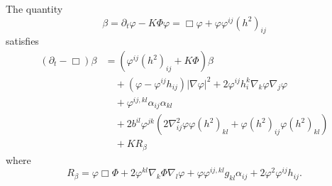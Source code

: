 \documentclass{amsart}
\begin{document}
\begin{lemma}
\label{lem:evbeta}
The quantity 
\[
\beta = \partial_t \varphi - K\Phi\varphi = \Box\varphi +  \varphi\varphi^{ij} (h^2)_{ij}
\]
satisfies
\[
\begin{split}
(\partial_{t} - \Box)\beta &= \left(\varphi^{ij}(h^2)_{ij} + K\Phi \right)\beta \\
&\quad + (\varphi - \varphi^{ij}h_{ij}) |\nabla\varphi|^{2} + 2\varphi^{ij}h^{k}_{i}\nabla_k \varphi \nabla_j \varphi \\
&\quad + \varphi^{ij,kl} \alpha_{ij} \alpha_{kl} \\
&\quad + 2b^{il}\varphi^{jk} (2\nabla^2_{ij}\varphi\varphi(h^2)_{kl} + \varphi(h^2)_{ij}\varphi(h^2)_{kl}) \\
&\quad + KR_{\beta}
\end{split}
\]
where
\[
R_{\beta} = \varphi \Box \Phi + 2\varphi^{kl} \nabla_k \Phi \nabla_l \varphi + \varphi \varphi^{ij,kl}g_{kl} \alpha_{ij} + 2\varphi^{2}\varphi^{ij}h_{ij}.
\]
\end{lemma}
\end{document}
